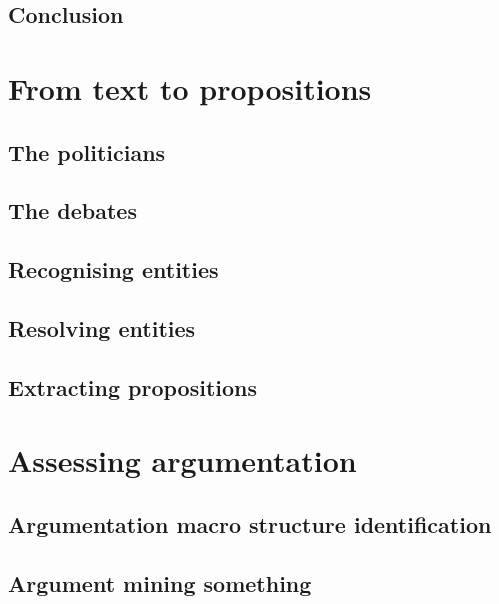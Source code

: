 \documentclass[11pt,a4paper]{DL}
\begin{document}
\chapter{Conclusion}
\label{conclusion}


\part{From text to propositions}

\chapter{The politicians}
\label{poligraph_paper}


\chapter{The debates}
\label{anforanden_paper}


\chapter{Recognising entities}
\label{ne_recognition_paper}


\chapter{Resolving entities}
\label{ne_resolution_paper}


\chapter{Extracting propositions}
\label{propositions_paper}


\part{Assessing argumentation}

\chapter{Argumentation macro structure identification}
\label{macro_paper}


\chapter{Argument mining something}
\label{mining_paper}


\printbibliography

\appendix

\backmatter
\end{document}
